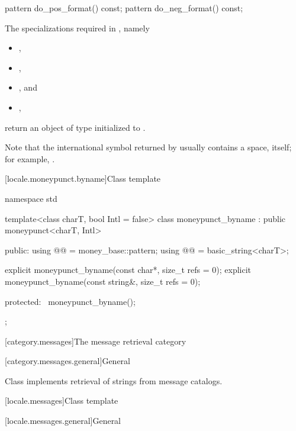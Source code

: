 %
%
\begin{itemdecl}
pattern do_pos_format() const;
pattern do_neg_format() const;
\end{itemdecl}

\begin{itemdescr}
\pnum
\returns
The specializations required in , namely
\begin{itemize}
\item {},
\item {},
\item {}, and
\item {},
\end{itemize}
return an object of type 
initialized to .
\begin{footnote}
Note that the international symbol returned by 
usually contains a space, itself;
for example, .
\end{footnote}
\end{itemdescr}

[locale.moneypunct.byname]{Class template }

%
\begin{codeblock}
namespace std {
  template<class charT, bool Intl = false>
  class moneypunct_byname : public moneypunct<charT, Intl> {
  public:
    using @@     = money_base::pattern;
    using @@ = basic_string<charT>;

    explicit moneypunct_byname(const char*, size_t refs = 0);
    explicit moneypunct_byname(const string&, size_t refs = 0);

  protected:
    ~moneypunct_byname();
  };
}
\end{codeblock}

[category.messages]{The message retrieval category}

[category.messages.general]{General}

\pnum
Class 
implements retrieval of strings from message catalogs.

[locale.messages]{Class template }

[locale.messages.general]{General}

